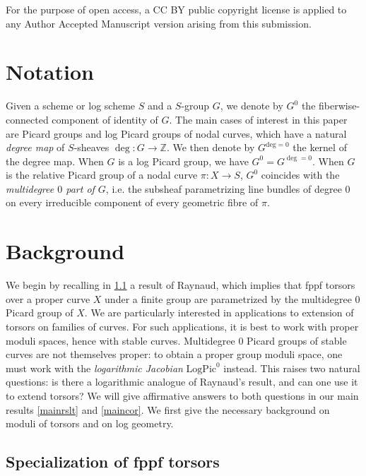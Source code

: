 \documentclass[a4paper,11pt]{amsart} %
\numberwithin{equation}{subsection}
\newcommand{\on}[1]{\operatorname{#1}}
\newcommand{\bb}[1]{{\mathbb{#1}}}
\theoremstyle{definition}
\theoremstyle{plain}%
\theoremstyle{remark}
\begin{document}
For the purpose of open access, a CC BY public copyright license is applied to any Author Accepted Manuscript version arising from this submission.

\section*{Notation}\label{Notation}
 Given a scheme or log scheme $S$ and a $S$-group $G$, we denote by $G^0$ the fiberwise-connected component of identity of $G$. The main cases of interest in this paper are Picard groups and log Picard groups of nodal curves, which have a natural \emph{degree map} of $S$-sheaves $\on{deg} \colon G \to \bb Z$. We then denote by $G^{\mathrm{deg}=0}$ the kernel of the degree map. When $G$ is a log Picard group, we have $G^0=G^{\deg=0}$. When $G$ is the relative Picard group of a nodal curve $\pi \colon X \to S$, $G^0$ coincides with the \emph{multidegree $0$ part of $G$}, i.e. the subsheaf parametrizing line bundles of degree $0$ on every irreducible component of every geometric fibre of $\pi$.%

\section{Background}\label{background}

We begin by recalling in \ref{Raynaud} a result of Raynaud, which implies that fppf torsors over a proper curve $X$ under a finite group are parametrized by the multidegree $0$ Picard group of $X$. We are particularly interested in applications to extension of torsors on families of curves. For such applications, it is best to work with proper moduli spaces, hence with stable curves. Multidegree $0$ Picard groups of stable curves are not themselves proper: to obtain a proper group moduli space, one must work with the \emph{logarithmic Jacobian} $\mathrm{LogPic}^{0}$ instead. This raises two natural questions: is there a logarithmic analogue of Raynaud's result, and can one use it to extend torsors? We will give affirmative answers to both questions in our main results \ref{mainrslt} and \ref{maincor}. We first give the necessary background on moduli of torsors and on log geometry.



\subsection{Specialization of fppf torsors}\label{Raynaud}
\end{document}
